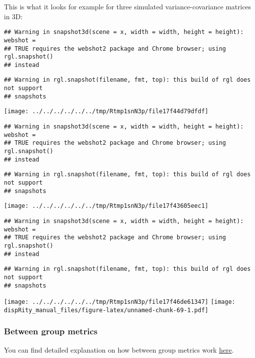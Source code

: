 \documentclass[
]{book}
\begin{document}
This is what it looks for example for three simulated variance-covariance matrices in 3D:

\begin{verbatim}
## Warning in snapshot3d(scene = x, width = width, height = height): webshot =
## TRUE requires the webshot2 package and Chrome browser; using rgl.snapshot()
## instead
\end{verbatim}

\begin{verbatim}
## Warning in rgl.snapshot(filename, fmt, top): this build of rgl does not support
## snapshots
\end{verbatim}

\texttt{[image: ../../../../../../tmp/Rtmp1snN3p/file17f44d79dfdf]}

\begin{verbatim}
## Warning in snapshot3d(scene = x, width = width, height = height): webshot =
## TRUE requires the webshot2 package and Chrome browser; using rgl.snapshot()
## instead
\end{verbatim}

\begin{verbatim}
## Warning in rgl.snapshot(filename, fmt, top): this build of rgl does not support
## snapshots
\end{verbatim}

\texttt{[image: ../../../../../../tmp/Rtmp1snN3p/file17f43605eec1]}

\begin{verbatim}
## Warning in snapshot3d(scene = x, width = width, height = height): webshot =
## TRUE requires the webshot2 package and Chrome browser; using rgl.snapshot()
## instead
\end{verbatim}

\begin{verbatim}
## Warning in rgl.snapshot(filename, fmt, top): this build of rgl does not support
## snapshots
\end{verbatim}

\texttt{[image: ../../../../../../tmp/Rtmp1snN3p/file17f46de61347]}
\texttt{[image: dispRity\_manual\_files/figure-latex/unnamed-chunk-69-1.pdf]}

\hypertarget{betweengroupmetricslist}{%
\subsubsection{Between group metrics}\label{betweengroupmetricslist}}

You can find detailed explanation on how between group metrics work \protect\hyperlink{betweengroupmetricsexplain}{here}.
\end{document}
